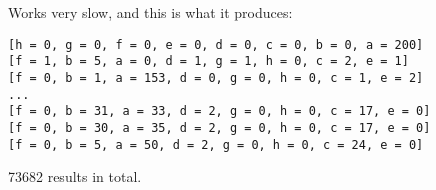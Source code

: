 Works very slow, and this is what it produces:

\begin{lstlisting}
[h = 0, g = 0, f = 0, e = 0, d = 0, c = 0, b = 0, a = 200]
[f = 1, b = 5, a = 0, d = 1, g = 1, h = 0, c = 2, e = 1]
[f = 0, b = 1, a = 153, d = 0, g = 0, h = 0, c = 1, e = 2]
...
[f = 0, b = 31, a = 33, d = 2, g = 0, h = 0, c = 17, e = 0]
[f = 0, b = 30, a = 35, d = 2, g = 0, h = 0, c = 17, e = 0]
[f = 0, b = 5, a = 50, d = 2, g = 0, h = 0, c = 24, e = 0]
\end{lstlisting}

73682 results in total.
